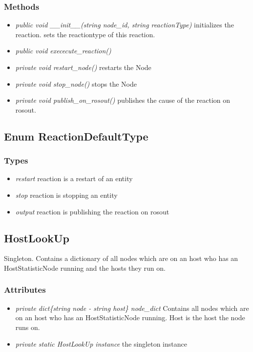 \subsubsection{Methods}
\begin{itemize}
	\item \textit{ public void \_\_init\_\_(string node\_id, string reactionType) }
		initializes the reaction. sets the reactiontype of this reaction.
	\item \textit{ public void exececute\_reaction() }
	\item \textit{ private void restart\_node() }
		restarts the Node
	\item \textit{ private void stop\_node() }
		stops the Node
	\item \textit{ private void publish\_on\_rosout() }
		publishes the cause of the reaction on rosout.
\end{itemize}


\subsection{Enum ReactionDefaultType}
\subsubsection{Types}
\begin{itemize}
	\item \textit{ restart }
		reaction is a restart of an entity
	\item \textit{ stop }
		reaction is stopping an entity
	\item \textit{ output }
		reaction is publishing the reaction on rosout
\end{itemize}


\subsection{HostLookUp}
Singleton. Contains a dictionary of all nodes which are on an host who has an HostStatisticNode running and the hosts they run on.
\subsubsection{Attributes}
\begin{itemize}
	\item \textit{ private dict\{string node - string host\} node\_dict }
		Contains all nodes which are on an host who has an HostStatisticNode running. Host is the host the node runs on.
	\item \textit{ private static HostLookUp instance }
		the singleton instance
\end{itemize}
